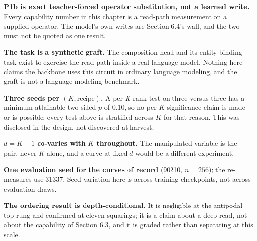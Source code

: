 \textbf{P1b is exact teacher-forced operator substitution, not a learned
write.} Every capability number in this chapter is a read-path
measurement on a supplied operator. The model's own writes are Section
6.4's wall, and the two must not be quoted as one result.

\textbf{The task is a synthetic graft.} The composition head and its
entity-binding task exist to exercise the read path inside a real
language model. Nothing here claims the backbone uses this circuit in
ordinary language modeling, and the graft is not a language-modeling
benchmark.

\textbf{Three seeds per $(K, \mathrm{recipe})$.} A per-$K$ rank test on three
versus three has a minimum attainable two-sided $p$ of 0.10, so no
per-$K$ significance claim is made or is possible; every test above is
stratified across $K$ for that reason. This was disclosed in the design,
not discovered at harvest.

\textbf{$d = K{+}1$ co-varies with $K$ throughout.} The manipulated variable
is the pair, never $K$ alone, and a curve at fixed $d$ would be a
different experiment.

\textbf{One evaluation seed for the curves of record} (90210, $n{=}256$); the
re-measures use 31337. Seed variation here is across training
checkpoints, not across evaluation draws.

\textbf{The ordering result is depth-conditional.} It is negligible at the
antipodal top rung and confirmed at eleven squarings; it is a claim
about a deep read, not about the capability of Section 6.3, and it is
graded rather than separating at this scale.

